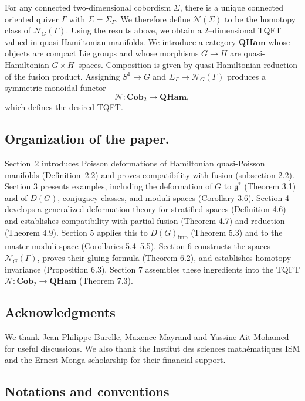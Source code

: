 \documentclass[reqno]{amsart}
\theoremstyle{plain}
\theoremstyle{definition}
\begin{document}
For any connected two-dimensional cobordism $\Sigma$, there is a unique connected oriented quiver $\Gamma$ with $\Sigma=\Sigma_{\Gamma}$. We therefore define $\mathcal{N}(\Sigma)$ to be the homotopy class of $\mathcal{N}_{G}(\Gamma)$. Using the results above, we obtain a $2$--dimensional TQFT valued in quasi-Hamiltonian manifolds. We introduce a category $\mathbf{QHam}$ whose objects are compact Lie groups and whose morphisms $G\to H$ are quasi-Hamiltonian $G\times H$--spaces. Composition is given by quasi-Hamiltonian reduction of the fusion product. Assigning $S^{1}\mapsto G$ and $\Sigma_{\Gamma}\mapsto\mathcal{N}_{G}(\Gamma)$ produces a symmetric monoidal functor
\[
\mathcal{N}:\mathbf{Cob}_{2}\longrightarrow\mathbf{QHam},
\]
which defines the desired TQFT.

\subsection*{Organization of the paper.}
Section~2 introduces Poisson deformations of Hamiltonian quasi-Poisson manifolds (Definition~2.2) and proves compatibility with fusion (subsection 2.2). Section 3 presents examples, including the deformation of $G$ to $\mathfrak{g}^{*}$ (Theorem 3.1) and of $D(G)$, conjugacy classes, and moduli spaces (Corollary 3.6). Section 4 develops a generalized deformation theory for stratified spaces (Definition 4.6) and establishes compatibility with partial fusion (Theorem 4.7) and reduction (Theorem 4.9). Section 5 applies this to $D(G)_{\mathrm{imp}}$ (Theorem 5.3) and to the master moduli space (Corollaries 5.4--5.5). Section 6 constructs the spaces $\mathcal{N}_{G}(\Gamma)$, proves their gluing formula (Theorem 6.2), and establishes homotopy invariance (Proposition 6.3). Section 7 assembles these ingredients into the TQFT $\mathcal{N}:\mathbf{Cob}_{2}\to\mathbf{QHam}$ (Theorem 7.3).




\subsection*{Acknowledgments} We thank Jean-Philippe Burelle, Maxence Mayrand and Yassine Ait Mohamed for useful discussions. We also thank the Institut des sciences mathématiques ISM and the Ernest-Monga scholarship for their financial support.



\subsection{Notations and conventions}
\end{document}
